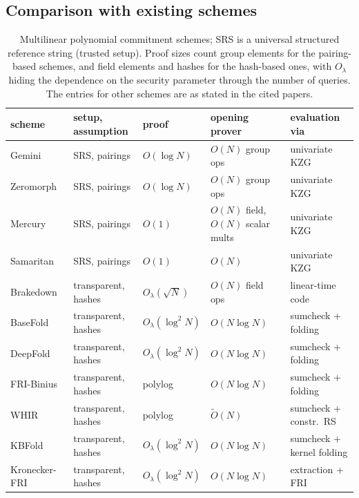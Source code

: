 \subsection{Comparison with existing schemes}\label{sec:apps:compare}

\begin{table}[t]
\centering
\footnotesize
\setlength{\tabcolsep}{2.5pt}
\begin{tabular}{l l l l l}
\toprule
scheme & setup, assumption & proof & opening prover & evaluation via \\
\midrule
Gemini~\cite{BCHO22} & SRS, pairings & $O(\log N)$ & $O(N)$ group ops & univariate KZG \\
Zeromorph~\cite{KT24} & SRS, pairings & $O(\log N)$ & $O(N)$ group ops & univariate KZG \\
Mercury~\cite{EG25} & SRS, pairings & $O(1)$ & $O(N)$ field, $O(N)$ scalar mults & univariate KZG \\
Samaritan~\cite{GPS25} & SRS, pairings & $O(1)$ & $O(N)$ & univariate KZG \\
\midrule
Brakedown~\cite{GLSTW23} & transparent, hashes & $O_\lambda(\sqrt N)$ & $O(N)$ field ops & linear-time code \\
BaseFold~\cite{ZCF24} & transparent, hashes & $O_\lambda(\log^2 N)$ & $O(N \log N)$ & sumcheck + folding \\
DeepFold~\cite{GLHQTZ25} & transparent, hashes & $O_\lambda(\log^2 N)$ & $O(N \log N)$ & sumcheck + folding \\
FRI-Binius~\cite{DP24} & transparent, hashes & polylog & $O(N \log N)$ & sumcheck + folding \\
WHIR~\cite{ACFY24} & transparent, hashes & polylog & $\tilde O(N)$ & sumcheck + constr.\ RS \\
KBFold~\cite{Mkh26} & transparent, hashes & $O_\lambda(\log^2 N)$ & $O(N \log N)$ & sumcheck + kernel folding \\
Kronecker-FRI & transparent, hashes & $O_\lambda(\log^2 N)$ & $O(N \log N)$ & extraction + FRI \\
\bottomrule
\end{tabular}
\caption{Multilinear polynomial commitment schemes; SRS is a universal structured reference string (trusted setup). Proof sizes count group elements for the pairing-based schemes, and field elements and hashes for the hash-based ones, with $O_\lambda$ hiding the dependence on the security parameter through the number of queries. The entries for other schemes are as stated in the cited papers.}
\label{tab:apps-compare}
\end{table}

